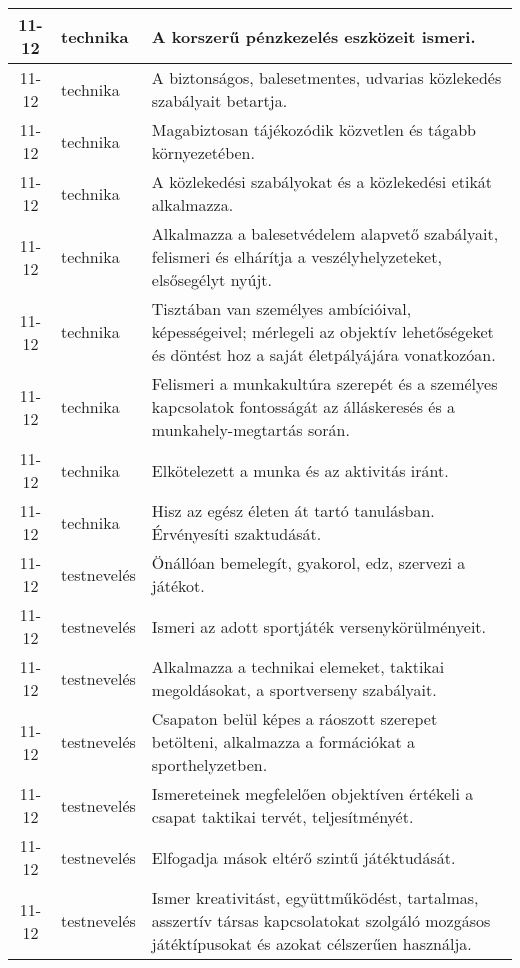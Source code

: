 \begin{small}
\begin{longtable}{c | p{2cm} |  p{11cm} }
              11-12 & technika & A korszerű pénzkezelés eszközeit ismeri. \\ \hline
              11-12 & technika & A biztonságos, balesetmentes, udvarias közlekedés szabályait betartja. \\ \hline
              11-12 & technika & Magabiztosan tájékozódik közvetlen és tágabb környezetében. \\ \hline
              11-12 & technika & A közlekedési szabályokat és a közlekedési etikát alkalmazza. \\ \hline
              11-12 & technika & Alkalmazza a balesetvédelem alapvető szabályait, felismeri és elhárítja a veszélyhelyzeteket, elsősegélyt nyújt. \\ \hline
              11-12 & technika & Tisztában van személyes ambícióival, képességeivel; mérlegeli az objektív lehetőségeket és döntést hoz a saját életpályájára vonatkozóan. \\ \hline
              11-12 & technika & Felismeri a munkakultúra szerepét és a személyes kapcsolatok fontosságát az álláskeresés és a munkahely-megtartás során. \\ \hline
              11-12 & technika & Elkötelezett a munka és az aktivitás iránt. \\ \hline
              11-12 & technika & Hisz az egész életen át tartó tanulásban. Érvényesíti szaktudását. \\ \hline
              11-12 & testnevelés & Önállóan bemelegít, gyakorol, edz, szervezi a játékot. \\ \hline
              11-12 & testnevelés & Ismeri az adott sportjáték versenykörülményeit. \\ \hline
              11-12 & testnevelés & Alkalmazza a technikai elemeket, taktikai megoldásokat, a sportverseny szabályait. \\ \hline
              11-12 & testnevelés & Csapaton belül képes a ráoszott szerepet betölteni, alkalmazza a formációkat a sporthelyzetben. \\ \hline
              11-12 & testnevelés & Ismereteinek megfelelően objektíven értékeli a csapat taktikai tervét, teljesítményét. \\ \hline
              11-12 & testnevelés & Elfogadja mások eltérő szintű játéktudását. \\ \hline
              11-12 & testnevelés & Ismer kreativitást, együttműködést, tartalmas, asszertív társas kapcsolatokat szolgáló mozgásos játéktípusokat és azokat célszerűen használja. \\ \hline

\end{longtable}
\end{small}
